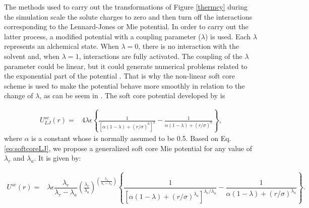 	The methods used to carry out the transformations of Figure \ref{thermcy} during the simulation scale the solute charges to zero and then turn off the interactions corresponding to the Lennard-Jones or Mie potential. In order to carry out the latter process, a modified potential with a coupling parameter ($\lambda$) is used. Each $\lambda$ represents an alchemical state. When $\lambda=0$, there is no interaction with the solvent and, when $\lambda=1$, interactions are fully activated. The coupling of the $\lambda$ parameter could be linear, but it could generate numerical problems related to the exponential part of the potential \cite{shirts2013}.  That is why the non-linear soft core scheme \cite{beutler1994} is used to make the potential behave more smoothly in relation to the change of $\lambda$, as can be seem in . The soft core potential developed by  is  
	
	\begin{equation}
	\label{eq:softcoreLJ}
	\begin{aligned}
	U_{LJ}^{sc}(r) {}=& 4\lambda\epsilon \left\lbrace\frac{1}{\left[\alpha(1-\lambda)+ (r/\sigma)^{6}\right]^{2}} - \frac{1}{\alpha(1-\lambda)+(r/\sigma)^{6}}\right\rbrace ,
	\end{aligned}
	\end{equation}
	where $\alpha$ is a constant whose is  normally assumed to be 0.5.	Based on Eq. \ref{eq:softcoreLJ}, we propose a generalized soft core Mie potential for any value of $\lambda _{r}$ and $\lambda _{a}$. It is given by:
	
	\begin{equation}
	\label{eq:softcore}
	\begin{aligned}
	U^{sc}(r) {}=& \lambda\epsilon\dfrac{\lambda_r}{\lambda_r - \lambda_a} \left(\frac{\lambda_r}{\lambda_a} \right)^{\left( \frac{\lambda_a}{\lambda_r - \lambda_a} \right)} \left\lbrace\dfrac{1}{\left[\alpha(1-\lambda)+ (r/\sigma)^{\lambda_a}\right]^{\lambda_{r}/\lambda_{a}}} - \dfrac{1}{\alpha(1-\lambda)+(r/\sigma)^{\lambda_a}}\right\rbrace .
	\end{aligned}
	\end{equation}
	
